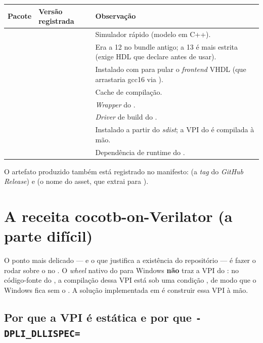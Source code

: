 \begin{tabularx}{\linewidth}{Y Y Z}
\toprule
\textbf{Pacote} & \textbf{Versão registrada} & \textbf{Observação} \\
\midrule
{} &  & Simulador rápido (modelo em C++). \\
 &  & Era a 12 no bundle antigo; a 13 é mais estrita (exige HDL que declare antes de usar). \\
 &  & Instalado com  para pular o \emph{frontend} VHDL (que arrastaria gcc16 via ). \\
 &  & Cache de compilação. \\
 &  & \emph{Wrapper} do . \\
 &  & \emph{Driver} de build do . \\
 &  & Instalado a partir do \emph{sdist}; a VPI do  é compilada à mão. \\
 &  & Dependência de runtime do . \\
\bottomrule
\end{tabularx}

\medskip

O artefato produzido também está registrado no manifesto: 
(a \emph{tag} do \emph{GitHub Release}) e 
(o nome do asset, que extrai para ).

\section{A receita cocotb-on-Verilator (a parte difícil)}
\label{sec:14-recipe}

O ponto mais delicado --- e o que justifica a existência do repositório --- é
fazer o  rodar sobre o  no . O
\emph{wheel} nativo do  para Windows \textbf{não} traz a VPI do
: no código-fonte do , a compilação dessa VPI está
sob uma condição , de modo que o Windows fica sem o
. A solução implementada em
 é construir essa VPI à mão.

\subsection{Por que a VPI é estática e por que \texttt{-DPLI\_DLLISPEC=}}

